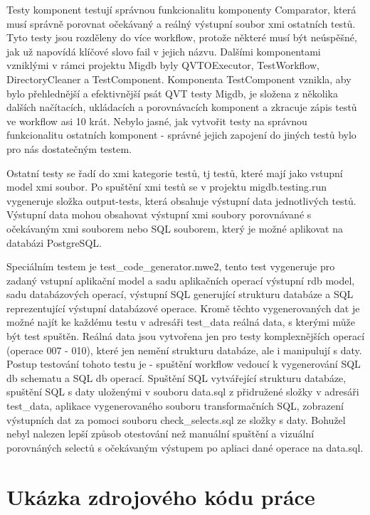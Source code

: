 \documentclass[11pt,twoside,a4paper]{book}
\begin{document}
Testy komponent testují správnou funkcionalitu komponenty Comparator, která
musí správně porovnat očekávaný a reálný výstupní soubor xmi ostatních testů.
Tyto testy jsou rozděleny do více workflow, protože některé musí být neúspěšné,
jak už napovídá klíčové slovo fail v jejich názvu. Dalšími komponentami
vzniklými v rámci projektu Migdb byly QVTOExecutor, TestWorkflow,
DirectoryCleaner a TestComponent. Komponenta TestComponent vznikla, aby bylo
přehlednější a efektivnější psát QVT testy Migdb, je složena z několika dalších
načítacích, ukládacích a porovnávacích komponent a zkracuje zápis testů ve
workflow asi 10 krát. Nebylo jasné, jak vytvořit testy na správnou funkcionalitu
ostatních komponent - správné jejich zapojení do jiných testů bylo pro nás
dostatečným testem.

Ostatní testy se řadí do xmi kategorie testů, tj testů, které mají jako
vstupní model xmi soubor. Po spuštění xmi testů se v projektu
migdb.testing.run vygeneruje složka output-tests, která obsahuje výstupní data 
jednotlivých testů. Výstupní data mohou obsahovat výstupní xmi soubory
porovnávané s očekávaným xmi souborem nebo SQL souborem, který je možné
aplikovat na databázi PostgreSQL.

Speciálním testem je test\_code\_generator.mwe2, tento test vygeneruje pro
zadaný vstupní aplikační model a sadu aplikačních operací výstupní rdb model, sadu
databázových operací, výstupní SQL generující strukturu databáze a SQL
reprezentující výstupní databázové operace. Kromě těchto vygenerovaných dat je
možné najít ke každému testu v adresáři test\_data reálná data, s kterými může
být test spuštěn. Reálná data jsou vytvořena jen pro testy komplexnějších
operací (operace 007 - 010), které jen nemění strukturu databáze, ale i
manipulují s daty. Postup testování tohoto testu je - spuštění workflow vedoucí k
vygenerování SQL db schematu a SQL db operací. Spuštění SQL vytvářející
strukturu databáze, spuštění SQL s daty uloženými v souboru data.sql z
přidružené složky v adresáři test\_data, aplikace vygenerovaného souboru
transformačních SQL, zobrazení výstupních dat za pomoci souboru
check\_selects.sql ze složky s daty. Bohužel nebyl nalezen lepší způsob
otestování než manuální spuštění a vizuální porovnáných selectů s očekávaným
výstupem po apliaci dané operace na data.sql.

\chapter{Ukázka zdrojového kódu práce}
\end{document}
